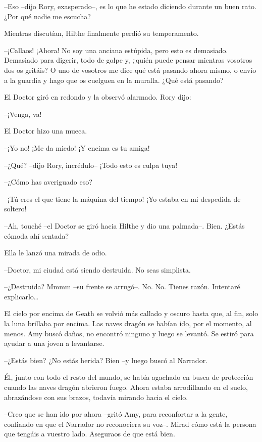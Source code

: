 {--Eso --dijo Rory, exasperado--, es lo que he estado diciendo durante
un buen rato. ¿Por qué nadie me escucha?}

{Mientras discutían, Hilthe finalmente perdió su temperamento.}

{--¡Callaos! ¡Ahora! No soy una anciana estúpida, pero esto es
	demasiado. Demasiado para digerir, todo de golpe y, ¿quién puede pensar
	mientras vosotros dos os gritáis? O uno de vosotros me dice qué está
	pasando ahora mismo, o envío a la guardia y hago que os cuelguen en la
muralla. ¿Qué está pasando?}

{El Doctor giró en redondo y la observó alarmado. Rory dijo:}

{--¡Venga, va!}

{El Doctor hizo una mueca.}

{--¡Yo no! ¡Me da miedo! ¡Y encima es tu amiga!}

{--¿Qué? --dijo Rory, incrédulo-- ¡Todo esto es culpa tuya!}

{--¿Cómo has averiguado eso?}

{--¡Tú eres el que tiene la máquina del tiempo! ¡Yo estaba en mi
despedida de soltero!}

{--Ah, touché --el Doctor se giró hacia Hilthe y dio una palmada--.
Bien. ¿Estás cómoda ahí sentada?}

{Ella le lanzó una mirada de odio.}

{--Doctor, mi ciudad está siendo destruida. No seas simplista.}

{--¿Destruida? Mmmm --su frente se arrugó--. No. No. Tienes razón.
	Intentaré explicarlo\ldots{}}

\mbox{}

{El cielo por encima de Geath se volvió más callado y oscuro hasta que,
	al fin, solo la luna brillaba por encima. Las naves dragón se habían
	ido, por el momento, al menos. Amy buscó daños, no encontró ninguno y
luego se levantó. Se estiró para ayudar a una joven a levantarse.}

{--¿Estás bien? ¿No estás herida? Bien --y luego buscó al Narrador.}

{Él, junto con todo el resto del mundo, se había agachado en busca de
	protección cuando las naves dragón abrieron fuego. Ahora estaba
	arrodillando en el suelo, abrazándose con sus brazos, todavía mirando
hacia el cielo.}

{--Creo que se han ido por ahora --gritó Amy, para reconfortar a la
	gente, confiando en que el Narrador no reconociera su voz--. Mirad cómo
está la persona que tengáis a vuestro lado. Aseguraos de que está bien.}

